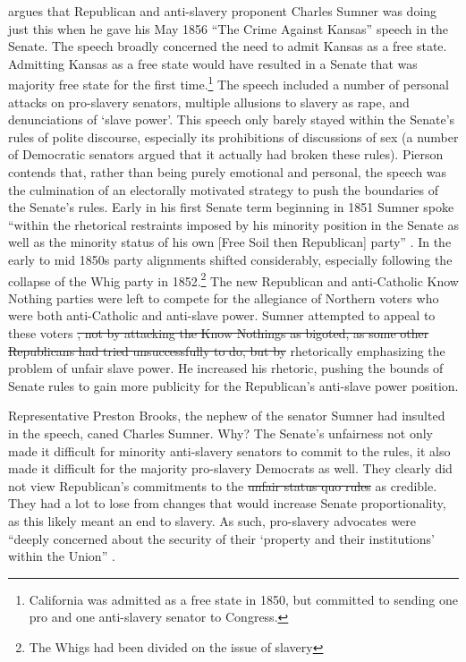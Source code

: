 \documentclass[a4paper]{article}\usepackage[]{graphicx}\usepackage[]{color}
\providecommand{\DIFaddtex}[1]{{\protect\color{blue}\uwave{#1}}} %
\providecommand{\DIFdeltex}[1]{{\protect\color{red}\sout{#1}}}                      %
\providecommand{\DIFaddbegin}{} %
\providecommand{\DIFaddend}{} %
\providecommand{\DIFdelbegin}{} %
\providecommand{\DIFdelend}{} %
\providecommand{\DIFadd}[1]{\texorpdfstring{\DIFaddtex{#1}}{#1}} %
\providecommand{\DIFdel}[1]{\texorpdfstring{\DIFdeltex{#1}}{}} %
\begin{document}
\cite{Pierson1995} argues that Republican and anti-slavery proponent Charles Sumner was doing just this when he gave his May 1856 ``The Crime Against Kansas'' speech in the Senate. The speech broadly concerned the need to admit Kansas as a free state. Admitting Kansas as a free state would have resulted in a Senate that was majority free state for the first time.\footnote{California was admitted as a free state in 1850, but committed to sending one pro and one anti-slavery senator to Congress.} The speech included a number of personal attacks on pro-slavery senators, multiple allusions to slavery as rape, and denunciations of `slave power'. This speech only barely stayed within the Senate's rules of polite discourse, especially its prohibitions of discussions of sex (a number of Democratic senators argued that it actually had broken these rules). Pierson contends that, rather than being purely emotional and personal, the speech was the culmination of an electorally motivated strategy to push the boundaries of the Senate's rules. Early in his first Senate term beginning in 1851 Sumner spoke ``within the rhetorical restraints imposed by his minority position in the Senate as well as the minority status of his own [Free Soil then Republican] party'' \cite[534]{Pierson1995}. In the early to mid 1850s party alignments shifted considerably, especially following the collapse of the Whig party in 1852.\footnote{The Whigs had been divided on the issue of slavery} The new Republican and anti-Catholic Know Nothing parties were left to compete for the allegiance of Northern voters who were both anti-Catholic and anti-slave power. Sumner attempted to appeal to these voters \DIFdelbegin \DIFdel{, not by attacking the Know Nothings as bigoted, as some other Republicans had tried unsuccessfully to do, but by }\DIFdelend \DIFaddbegin \DIFadd{by }\DIFaddend rhetorically emphasizing the problem of unfair slave power. He increased his rhetoric, pushing the bounds of Senate rules to gain more publicity for the Republican's anti-slave power position.

Representative Preston Brooks, the nephew of the senator Sumner had insulted in the speech, caned Charles Sumner. Why? The Senate's unfairness not only made it difficult for minority anti-slavery senators to commit to the rules, it also made it difficult for the majority pro-slavery Democrats as well. They clearly did not view Republican's commitments to the \DIFdelbegin \DIFdel{unfair status quo rules }\DIFdelend \DIFaddbegin \DIFadd{disproportionate status quo }\DIFaddend as credible. They had a lot to lose from changes that would increase Senate proportionality, as this likely meant an end to slavery. As such, pro-slavery advocates were ``deeply concerned about the security of their `property and their institutions' within the Union'' \cite[281]{Mittal2013}.
\end{document}
